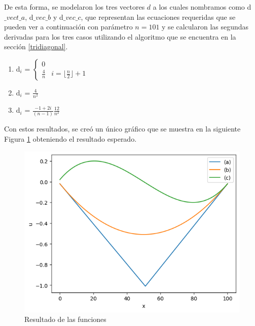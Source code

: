 De esta forma, se modelaron los tres vectores $d$ a los cuales nombramos como d$\_vect\_a$, d$\_vec\_b$  y d$\_vec\_c$, que representan las ecuaciones requeridas que se pueden ver a continuación con parámetro $n=101$  y se calcularon las segundas derivadas para los tres casos utilizando el algoritmo que se encuentra en la sección \ref{tridiagonal}.

\begin{enumerate}[label=\alph*)] %
\label{ec_ej4}
\item d$_{i}$ = 
    $\begin{cases}
      0\\
      \frac{4}{n} & i=\lfloor \frac{n}{2} \rfloor   +1
    \end{cases}$

\item d$_{i}$ = $\frac{4}{n^{2}}$

\item d$_{i}$ = $\frac{-1+2i}{(n-1)}\frac{12}{n^{2}}$

\end{enumerate}


Con estos resultados, se creó un único gráfico que se muestra en la siguiente Figura \ref{result_laplaciano} obteniendo el resultado esperado.

\begin{figure}[H]
\centerline{\includegraphics[scale=0.45]{./img/resultado_tridiag}}
\caption{Resultado de las funciones}
\label{result_laplaciano}
\end{figure}

